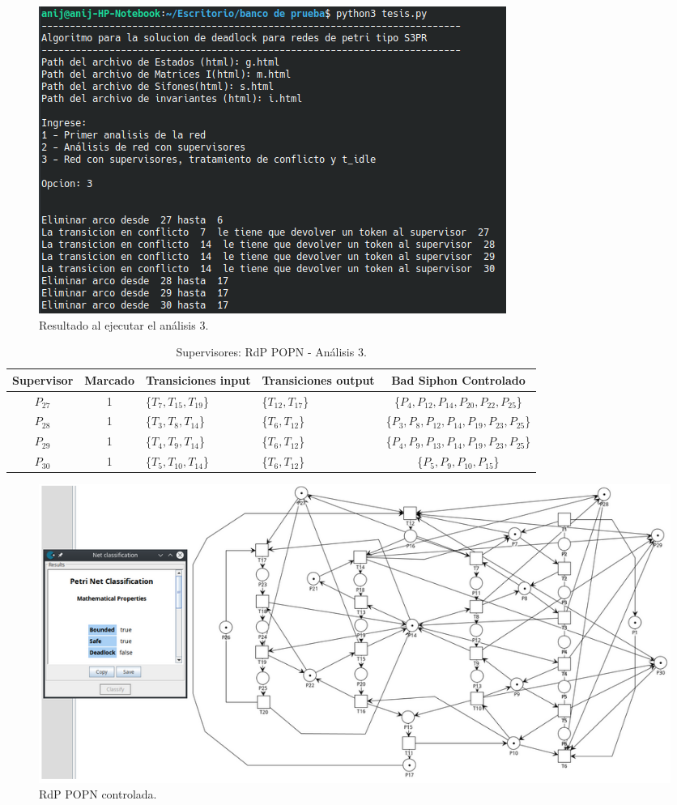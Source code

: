\begin{figure}[H]
	\centering
	\includegraphics[width=\textwidth]{Figures/algoritmo4/terminal-POPN-Ejec3.png}
	\caption{Resultado al ejecutar el análisis 3.}
	\label{fig:Rdp-POPN-3v4}
\end{figure}

\begin{table}[H]
    \small
    \centering
    \begin{tabular}{|c|c|P{2.2cm}|P{2.2cm}|c|}
    \hline
    \textbf{Supervisor} & \textbf{Marcado} & \textbf{Transiciones input} & \textbf{Transiciones output} & \textbf{Bad Siphon Controlado}  \\  \hline
    $P_{27}$ & 1 & \{$T_{7}, T_{15}, T_{19}$\} & \{$T_{12}, T_{17}$\} & \{$P_4, P_{12}, P_{14}, P_{20}, P_{22}, P_{25}$\} \\ 
    \hline
    $P_{28}$ & 1 & \{$T_{3}, T_{8}, T_{14}$\} & \{$T_{6}, T_{12}$\} & \{$P_{3},P_{8},P_{12},P_{14}, P_{19}, P_{23}, P_{25}$\} \\ 
    \hline
    $P_{29}$ & 1 & \{$T_{4}, T_{9}, T_{14}$\} & \{$T_{6}, T_{12}$\} & \{$P_{4},P_{9},P_{13},P_{14}, P_{19}, P_{23}, P_{25}$\} \\ 
    \hline
    $P_{30}$ & 1 & \{$T_{5}, T_{10}, T_{14}$\} & \{$T_{6}, T_{12}$\} & \{$P_{5},P_{9},P_{10},P_{15}$\} \\ 
    \hline
    \end{tabular}
    \caption{Supervisores: RdP POPN - Análisis 3.}
    \label{tab:POPN3-v4}
\end{table}

\begin{figure}[H]
	\centering
	\includegraphics[width=\textwidth]{Figures/algoritmo4/popn_imag3.png}
	\caption{RdP POPN controlada.}
	\label{fig:Rdp-POPN-Contv4}
\end{figure}
\bigskip


